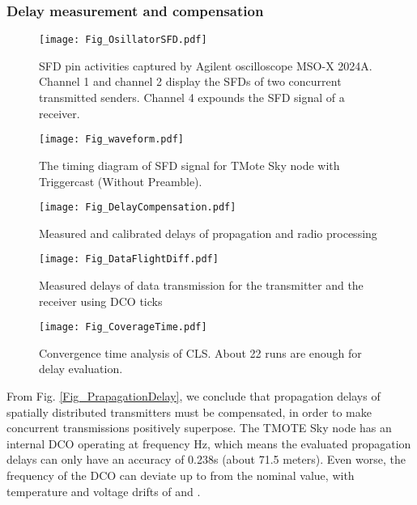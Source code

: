 \documentclass[conference]{IEEEtran}
\begin{document}
\subsubsection{Delay measurement and compensation}
\label{subsec_CLS}
\begin{figure}
\centering
\texttt{[image: Fig\_OsillatorSFD.pdf]}
\caption{SFD pin activities captured by Agilent oscilloscope MSO-X 2024A. Channel 1 and channel 2 display the SFDs of two concurrent transmitted senders. Channel 4 expounds the SFD signal of a receiver.}
\label{Fig_OsillatorSFD}
\end{figure}
\begin{figure}
\centering
\texttt{[image: Fig\_waveform.pdf]}
\caption{The timing diagram of SFD signal for TMote Sky node with Triggercast (Without Preamble).}
\label{Fig_waveform}
\end{figure}
\begin{figure*}[t]
  \centering
  \begin{minipage}[b]{0.32\textwidth}
    \centering
    \texttt{[image: Fig\_DelayCompensation.pdf]}
    \caption{Measured and calibrated delays of propagation and radio processing}
    \label{Fig_DelayCompensation}\end{minipage}\hspace{0.01\textwidth}\begin{minipage}[b]{0.32\textwidth}
    \centering
    \texttt{[image: Fig\_DataFlightDiff.pdf]}
    \caption{Measured delays of data transmission for the transmitter and the receiver using DCO ticks}
    \label{Fig_DataFlightDiff}\end{minipage}\hspace{0.01\linewidth}\begin{minipage}[b]{0.32\textwidth}
    \centering
    \texttt{[image: Fig\_CoverageTime.pdf]}
    \caption{Convergence time analysis of CLS. About 22 runs are enough for delay evaluation.}
    \label{Fig_CoverageTime}
  \end{minipage}\end{figure*}
\indent From Fig. \ref{Fig_PrapagationDelay}, we conclude that propagation delays of spatially distributed transmitters must be compensated, in order to make concurrent transmissions positively superpose.
The TMOTE Sky node has an internal DCO operating at frequency Hz, which means the evaluated propagation delays can only have an accuracy of 0.238s (about 71.5 meters).
Even worse, the frequency of the DCO can deviate up to  from the nominal value, with temperature and voltage drifts of  and .
\end{document}
